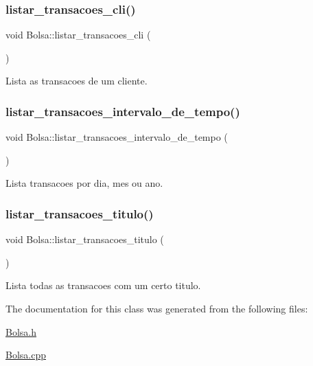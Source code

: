 \subsubsection{\texorpdfstring{listar\+\_\+transacoes\+\_\+cli()}{listar\_transacoes\_cli()}}
{\footnotesize\ttfamily void Bolsa\+::listar\+\_\+transacoes\+\_\+cli (\begin{DoxyParamCaption}{ }\end{DoxyParamCaption})}



Lista as transacoes de um cliente. 

\hypertarget{class_bolsa_acb012fa60aa074fd861168ca3aedadd0}{}\label{class_bolsa_acb012fa60aa074fd861168ca3aedadd0} 
\subsubsection{\texorpdfstring{listar\+\_\+transacoes\+\_\+intervalo\+\_\+de\+\_\+tempo()}{listar\_transacoes\_intervalo\_de\_tempo()}}
{\footnotesize\ttfamily void Bolsa\+::listar\+\_\+transacoes\+\_\+intervalo\+\_\+de\+\_\+tempo (\begin{DoxyParamCaption}{ }\end{DoxyParamCaption})}



Lista transacoes por dia, mes ou ano. 

\hypertarget{class_bolsa_aeac084d57bf9382c83516f1f0c043936}{}\label{class_bolsa_aeac084d57bf9382c83516f1f0c043936} 
\subsubsection{\texorpdfstring{listar\+\_\+transacoes\+\_\+titulo()}{listar\_transacoes\_titulo()}}
{\footnotesize\ttfamily void Bolsa\+::listar\+\_\+transacoes\+\_\+titulo (\begin{DoxyParamCaption}{ }\end{DoxyParamCaption})}



Lista todas as transacoes com um certo titulo. 



The documentation for this class was generated from the following files\+:\begin{DoxyCompactItemize}
\item 
\hyperlink{_bolsa_8h}{Bolsa.\+h}\item 
\hyperlink{_bolsa_8cpp}{Bolsa.\+cpp}\end{DoxyCompactItemize}
